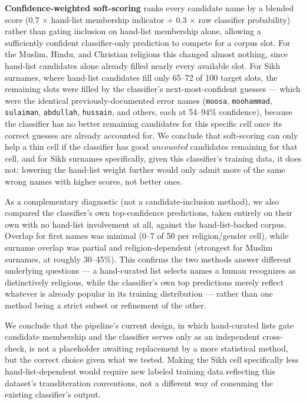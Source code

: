 \documentclass[11pt]{article}
\begin{document}
\textbf{Confidence-weighted soft-scoring} ranks every candidate name by a blended score (0.7 $\times$ hand-list membership indicator $+$ 0.3 $\times$ raw classifier probability) rather than gating inclusion on hand-list membership alone, allowing a sufficiently confident classifier-only prediction to compete for a corpus slot. For the Muslim, Hindu, and Christian religions this changed almost nothing, since hand-list candidates alone already filled nearly every available slot. For Sikh surnames, where hand-list candidates fill only 65--72 of 100 target slots, the remaining slots were filled by the classifier's next-most-confident guesses --- which were the identical previously-documented error names (\texttt{moosa}, \texttt{moohammad}, \texttt{sulaiman}, \texttt{abdullah}, \texttt{hussain}, and others, each at 54--94\% confidence), because the classifier has no better remaining candidates for this specific cell once its correct guesses are already accounted for. We conclude that soft-scoring can only help a thin cell if the classifier has good \emph{uncounted} candidates remaining for that cell, and for Sikh surnames specifically, given this classifier's training data, it does not; lowering the hand-list weight further would only admit more of the same wrong names with higher scores, not better ones.

As a complementary diagnostic (not a candidate-inclusion method), we also compared the classifier's own top-confidence predictions, taken entirely on their own with no hand-list involvement at all, against the hand-list-backed corpus. Overlap for first names was minimal (0--7 of 50 per religion/gender cell), while surname overlap was partial and religion-dependent (strongest for Muslim surnames, at roughly 30--45\%). This confirms the two methods answer different underlying questions --- a hand-curated list selects names a human recognizes as distinctively religious, while the classifier's own top predictions merely reflect whatever is already popular in its training distribution --- rather than one method being a strict subset or refinement of the other.

We conclude that the pipeline's current design, in which hand-curated lists gate candidate membership and the classifier serves only as an independent cross-check, is not a placeholder awaiting replacement by a more statistical method, but the correct choice given what we tested. Making the Sikh cell specifically less hand-list-dependent would require new labeled training data reflecting this dataset's transliteration conventions, not a different way of consuming the existing classifier's output.
\end{document}
